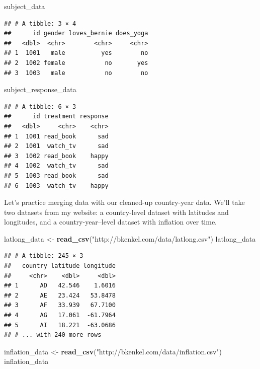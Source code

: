 \documentclass[12pt,oneside,openany]{book}
\newenvironment{Shaded}{\begin{snugshade}}{\end{snugshade}}
\newcommand{\KeywordTok}[1]{\textcolor[rgb]{0.13,0.29,0.53}{\textbf{#1}}}
\newcommand{\StringTok}[1]{\textcolor[rgb]{0.31,0.60,0.02}{#1}}
\newcommand{\NormalTok}[1]{#1}
\begin{document}
\begin{Shaded}
\begin{Highlighting}[]
\NormalTok{subject_data}
\end{Highlighting}
\end{Shaded}

\begin{verbatim}
## # A tibble: 3 × 4
##      id gender loves_bernie does_yoga
##   <dbl>  <chr>        <chr>     <chr>
## 1  1001   male          yes        no
## 2  1002 female           no       yes
## 3  1003   male           no        no
\end{verbatim}

\begin{Shaded}
\begin{Highlighting}[]
\NormalTok{subject_response_data}
\end{Highlighting}
\end{Shaded}

\begin{verbatim}
## # A tibble: 6 × 3
##      id treatment response
##   <dbl>     <chr>    <chr>
## 1  1001 read_book      sad
## 2  1001  watch_tv      sad
## 3  1002 read_book    happy
## 4  1002  watch_tv      sad
## 5  1003 read_book      sad
## 6  1003  watch_tv    happy
\end{verbatim}

Let's practice merging data with our cleaned-up country-year data. We'll
take two datasets from my website: a country-level dataset with
latitudes and longitudes, and a country-year--level dataset with
inflation over time.

\begin{Shaded}
\begin{Highlighting}[]
\NormalTok{latlong_data <-}\StringTok{ }\KeywordTok{read_csv}\NormalTok{(}\StringTok{"http://bkenkel.com/data/latlong.csv"}\NormalTok{)}
\NormalTok{latlong_data}
\end{Highlighting}
\end{Shaded}

\begin{verbatim}
## # A tibble: 245 × 3
##   country latitude longitude
##     <chr>    <dbl>     <dbl>
## 1      AD   42.546    1.6016
## 2      AE   23.424   53.8478
## 3      AF   33.939   67.7100
## 4      AG   17.061  -61.7964
## 5      AI   18.221  -63.0686
## # ... with 240 more rows
\end{verbatim}

\begin{Shaded}
\begin{Highlighting}[]
\NormalTok{inflation_data <-}\StringTok{ }\KeywordTok{read_csv}\NormalTok{(}\StringTok{"http://bkenkel.com/data/inflation.csv"}\NormalTok{)}
\NormalTok{inflation_data}
\end{Highlighting}
\end{Shaded}
\end{document}
